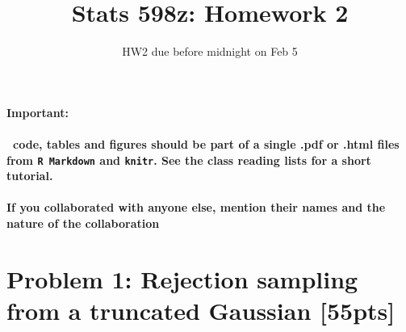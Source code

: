 \documentclass[10pt]{article}
\title{Stats 598z: Homework 2}
\author{HW2 due before midnight on Feb 5}
\date{}
\begin{document}
\maketitle
\textbf{Important:\\~\\
  \R\ code, tables and figures should be part of a single .pdf or .html files from {\tt R Markdown} and {\tt knitr}. 
See the class reading lists for a short tutorial.\\~\\
If you collaborated with anyone else, mention their names and the nature of the collaboration}

\section{Problem 1: Rejection sampling from a truncated Gaussian \hfill[55pts]}
\end{document}
